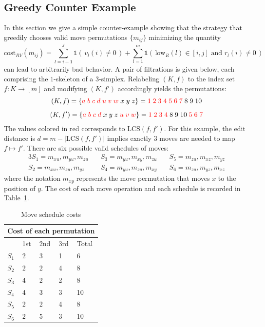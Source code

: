 \documentclass[sn-mathphys]{sn-jnl}
\begin{document}
\subsection{Greedy Counter Example}\label{sec:greedy_counter_ex}
In this section we give a simple counter-example showing that the strategy that greedily chooses valid move permutations $\{ m_{ij} \}$ minimizing the quantity
\begin{equation*}
\mathrm{cost}_{RV}(m_{ij}) = \sum\limits_{l=i+1}^j \mathds{1}\left(\, v_l(i) \neq 0 \, \right) + \sum\limits_{l=1}^m \mathds{1}\left(\, \mathrm{low}_R(l) \in [i,j] \text{ and } r_l(i) \neq 0 \, \right)
\end{equation*}
can lead to arbitrarily bad behavior. A pair of filtrations is given below, each comprising the $1$-skeleton of a $3$-simplex. Relabeling $(K, f)$ to the index set $f : K \to [m]$ and modifying $(K, f')$ accordingly yields the permutations: 
$$ (K, f) = \{ {\color{red} a \; b \; c \; d \; u \; v \; w} \; x \; y \; z  \} = { {\color{red} 1 \; 2 \; 3 \; 4 \; 5 \; 6 \; 7 } \; 8 \; 9 \; 10 } $$
$$ (K, f') = \{ {\color{red} a \; b \; c \; d } \; x \; y \; z \; {\color{red} u \; v \; w } \}  = { {\color{red} 1 \; 2 \; 3 \; 4 } \;8 \; 9 \; 10 \; {\color{red} 5 \; 6 \; 7 } }$$
The values colored in red corresponds to $\mathrm{LCS}(f, f')$. For this example, the edit distance is 
$d = m - \lvert \mathrm{LCS}(f, f') \rvert$ implies exactly $3$ moves are needed to map $f \mapsto f'$. There are six possible valid schedules of moves: 
\begin{alignat*}{3}
	S_1 = m_{x u}, m_{y u}, m_{z u} \quad & S_3 = m_{y u}, m_{x y}, m_{z u} \quad  & S_5 = m_{z u}, m_{x z}, m_{y z} \\
	S_2 = m_{x u}, m_{z u}, m_{y z} \quad  & S_4 = m_{y u}, m_{z u}, m_{x y} \quad  & S_6 = m_{z u}, m_{y z}, m_{x z} 
\end{alignat*}
where the notation $m_{x y}$ represents the move permutation that moves $x$ to the position of $y$. The cost of each  move operation and each schedule is recorded in Table~\ref{table:move_costs}.
\begin{table}[h]
\caption{Move schedule costs}
\centering
\begin{tabular}{ m{0.4cm} m{0.8cm} m{0.8cm} m{0.8cm} m{0.8cm}  }
 \hline
 \multicolumn{5}{c}{Cost of each permutation} \\
 \hline
 & 1st & 2nd & 3rd & Total\\
 \hline
 $S_1$ & 2 & 3 & 1 & 6 \\
 \hline 
 $S_2$ & 2 & 2 & 4 & 8 \\
  \hline 
 $S_3$ & 4 & 2 & 2 & 8 \\
  \hline 
 $S_4$ & 4 & 3 & 3 & 10 \\
  \hline 
 $S_5$ & 2 & 2 & 4 & 8  \\
  \hline 
 $S_6$ & 2 & 5 & 3 & 10\\
 \hline
\end{tabular}
\label{table:move_costs}
\end{table}
\end{document}
